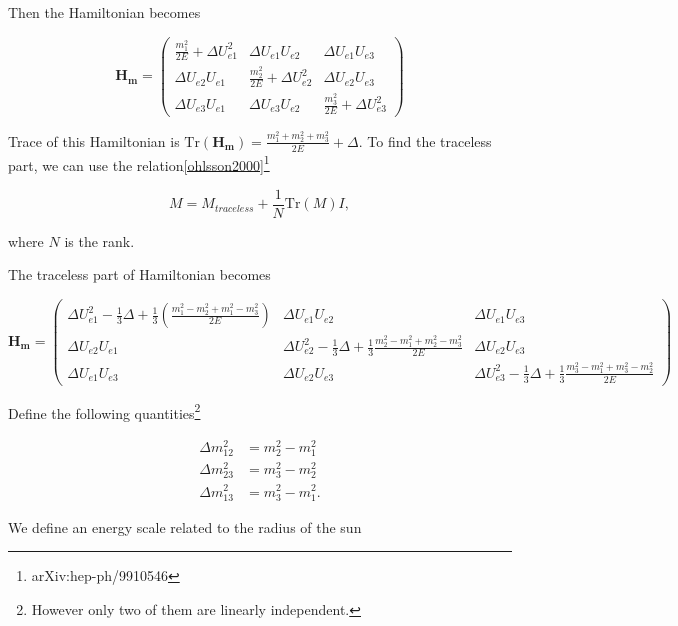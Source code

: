 \documentclass{tufte-handout}
\begin{document}
Then the Hamiltonian becomes

\begin{equation*}
\mathbf{H_{m}} = \begin{pmatrix}
\frac{m_1^2}{2E} + \Delta U_{e1}^2 & \Delta U_{e1} U_{e2} & \Delta U_{e1} U_{e3} \\
\Delta U_{e2} U_{e1} & \frac{m_2^2}{2E} + \Delta U_{e2}^2 & \Delta U_{e2} U_{e3} \\
\Delta U_{e3} U_{e1} & \Delta U_{e3} U_{e2} & \frac{m_3^2}{2E} + \Delta U_{e3}^2
\end{pmatrix}
\end{equation*}

Trace of this Hamiltonian is $\mathrm{Tr}(\mathbf{H_m}) = \frac{m_1^2+m_2^2+m_3^2}{2E}+\Delta$. To find the traceless part, we can use the relation\ref{ohlsson2000}\footnote{arXiv:hep-ph/9910546}

\begin{equation*}
M = M_{traceless}+ \frac{1}{N} \mathrm{Tr}(M) I,
\end{equation*}

where $N$ is the rank.


The traceless part of Hamiltonian becomes

\begin{equation*}
\mathbf{H_{m}} = \begin{pmatrix}
\Delta U_{e1}^2 - \frac{1}{3}\Delta + \frac{1}{3}(\frac{m_1^2-m_2^2 + m_1^2-m_3^2}{2E}) & \Delta U_{e1}U_{e2} & \Delta U_{e1} U_{e3} \\
\Delta U_{e2} U_{e1} & \Delta U_{e2}^2 -\frac{1}{3}\Delta + \frac{1}{3}\frac{m_2^2 - m_1^2+m_2^2-m_3^2}{2E} & \Delta U_{e2}U_{e3} \\
\Delta U_{e1} U_{e3} & \Delta U_{e2} U_{e3} & \Delta U_{e3}^2 -\frac{1}{3} \Delta + \frac{1}{3} \frac{m_3^2 - m_1^2 + m_3^2-m_2^2 }{2E}
\end{pmatrix}
\end{equation*}

Define the following quantities\footnote{However only two of them are linearly independent.}

\begin{align*}
\Delta m_{12}^2 & = m_2^2 - m_1^2 \\
\Delta m_{23}^2 & = m_3^2 - m_2^2 \\
\Delta m_{13}^2 & = m_3^2 - m_1^2.
\end{align*}


We define an energy scale related to the radius of the sun
\end{document}
